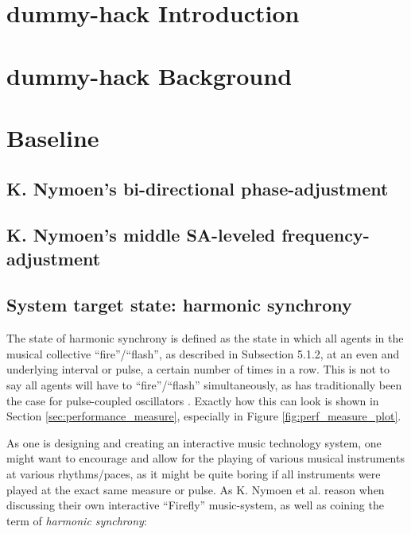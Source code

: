 


	\chapter{dummy-hack Introduction}
	\chapter{dummy-hack Background}
	\chapter{Baseline}
		\section{K. Nymoen's bi-directional phase-adjustment}
		\section{K. Nymoen's middle SA-leveled frequency-adjustment}
		\section{System target state: harmonic synchrony}
		\label{sec:harmonic_synchrony}

		The state of harmonic synchrony is defined \cite{nymoen_synch} as the state in which all agents in the musical collective ``fire''/``flash'', as described in Subsection 5.1.2, at an even and underlying interval or pulse, a certain number of times in a row. This is not to say all agents will have to ``fire''/``flash'' simultaneously, as has traditionally been the case for pulse-coupled oscillators \cite{}. Exactly how this can look is shown in Section \ref{sec:performance_measure}, especially in Figure \ref{fig:perf_measure_plot}.

		As one is designing and creating an interactive music technology system, one might want to encourage and allow for the playing of various musical instruments at various rhythms/paces, as it might be quite boring if all instruments were played at the exact same measure or pulse. As K. Nymoen et al. \cite{nymoen_synch} reason when discussing their own interactive ``Firefly'' music-system, as well as coining the term of \textit{harmonic synchrony}: \nl

